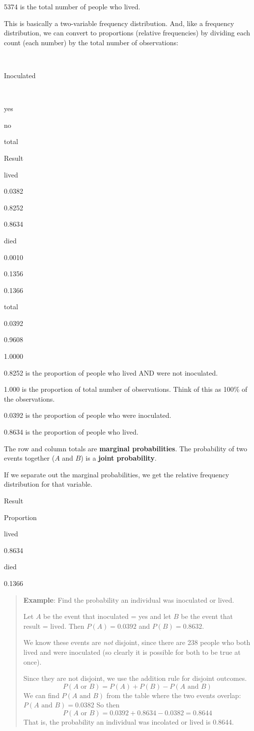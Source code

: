 \documentclass[
]{book}
\begin{document}
{5374} is the total number of people who lived.

This is basically a two-variable frequency distribution. And, like a frequency distribution, we can convert to proportions (relative frequencies) by dividing each count (each number) by the total number of observations:

~

Inoculated

~

yes

no

total

Result

lived

0.0382

{0.8252}

{0.8634}

died

0.0010

0.1356

0.1366

total

{0.0392}

0.9608

{1.0000}

{0.8252} is the proportion of people who lived AND were not inoculated.~

{1.000} is the proportion of total number of observations. Think of this as 100\% of the observations.

{0.0392} is the proportion of people who were inoculated.

{0.8634} is the proportion of people who lived.

The row and column totals are \textbf{marginal probabilities}. The probability of two events together (\(A\) and \(B\)) is a \textbf{joint probability}.

If we separate out the marginal probabilities, we get the relative frequency distribution for that variable.

Result

Proportion

lived

0.8634

died

0.1366

\begin{quote}
\textbf{Example}: Find the probability an individual was inoculated or lived.

Let \(A\) be the event that inoculated = yes and let \(B\) be the event that result = lived. Then \(P(A) = 0.0392\) and \(P(B) = 0.8632\).

We know these events are \emph{not} disjoint, since there are 238 people who both lived and were inoculated (so clearly it is possible for both to be true at once).

Since they are not disjoint, we use the addition rule for disjoint outcomes. \[P(A \text{ or } B) = P(A) + P(B) - P(A \text{ and } B)\]
We can find \(P(A \text{ and } B)\) from the table where the two events overlap: \(P(A \text{ and } B) = 0.0382\)
So then \[P(A \text{ or } B) = 0.0392 + 0.8634 - 0.0382 = 0.8644\] That is, the probability an individual was incolated or lived is 0.8644.
\end{quote}
\end{document}
